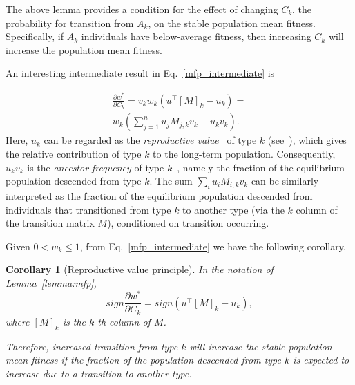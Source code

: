 \documentclass[9pt, a4paper, twocolumn]{extarticle}
\newcommand*{\tr}{^\intercal}
\newtheorem{corollary}{Corollary}
\begin{document}
The above lemma provides a condition for the effect of changing $C_k$, the probability for transition from $A_k$, on the stable population mean fitness.
Specifically, if $A_k$ individuals have below-average fitness, then increasing $C_k$ will increase the population mean fitness.


An interesting intermediate result in Eq.~\ref{mfp_intermediate} is

\begin{equation}
\begin{aligned}
\frac{\partial \bar{w}^*}{\partial C_k} = 
v_k w_k (u\tr[M]_k - u_k) = \\
w_k (\sum_{j=1}^{n}{u_j M_{j,k} v_k} - u_k v_k).
\end{aligned}
\end{equation}
Here, $u_k$ can be regarded as the \emph{reproductive value}~\citep[pg.~27]{Fisher1930} of type $k$ (see~), which gives the relative contribution of type $k$ to the long-term population.
Consequently, $u_k v_k$ is the \emph{ancestor frequency} of type $k$~\citep{Hermisson2002}, namely the fraction of the equilibrium population descended from type $k$.
The sum $\sum_i{u_i M_{i,k} v_k}$ can be similarly interpreted as the fraction of the equilibrium population descended from individuals that transitioned from type $k$ to another type (via the $k$ column of the transition matrix $M$), conditioned on transition occurring.

Given $0 < w_k \le 1$, from Eq.~\ref{mfp_intermediate} we have the following corollary.

\begin{corollary}[Reproductive value principle]
In the notation of Lemma~\ref{lemma:mfp},
\begin{equation}
sign \frac{\partial \bar{w}^*}{\partial C_k} = 
sign (u\tr [M]_k - u_k),
\end{equation}
where $[M]_k$ is the $k$-th column of $M$.

Therefore, increased transition from type $k$ will increase the stable population mean fitness if the fraction of the population descended from type $k$ is expected to increase due to a transition to another type. 
\end{corollary}

\end{document}
